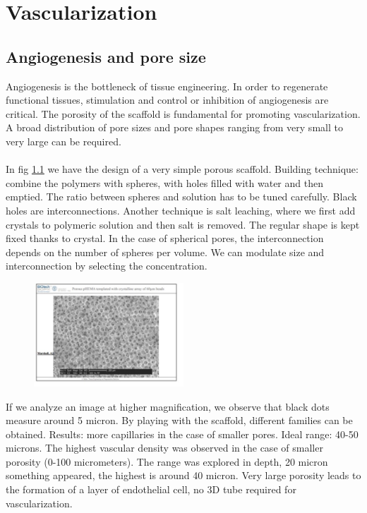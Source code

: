 \graphicspath{{chapters/vascularization/}}
\chapter{Vascularization}

\section{Angiogenesis and pore size}
Angiogenesis is the bottleneck of tissue engineering. 
In order to regenerate functional tissues, stimulation and control or inhibition of angiogenesis are critical.
The porosity of the scaffold is fundamental for promoting vascularization.
A broad distribution of pore sizes and pore shapes ranging from very small to very large can be required.
\\
\\
\noindent
In fig \ref{fig:pores} we have the design of a very simple porous scaffold. 
Building technique: combine the polymers with spheres, with holes filled with water and then emptied. 
The ratio between spheres and solution has to be tuned carefully.
Black holes are interconnections. Another technique is salt leaching, where we first add crystals to polymeric solution and then salt is removed.  The regular shape is kept fixed thanks to crystal. 
In the case of spherical pores,  the interconnection depends on the number of spheres per volume. We can modulate size and interconnection by selecting the concentration. 

\begin{figure}[h]
\centering
\includegraphics[width=0.5\textwidth]{pores}
\caption{\label{fig:pores}}
\end{figure}

If we analyze an image at higher magnification,  we observe that black dots measure around 5 micron. 
By playing with the scaffold, different families can be obtained. 
Results: more capillaries in the case of smaller pores. Ideal range: 40-50 microns. 
The highest vascular density was observed in the case of smaller porosity (0-100 micrometers). 
The range was explored in depth, 20 micron something appeared, the highest is around 40 micron. Very large porosity leads to the formation of a layer of endothelial cell, no 3D tube required for vascularization.  

